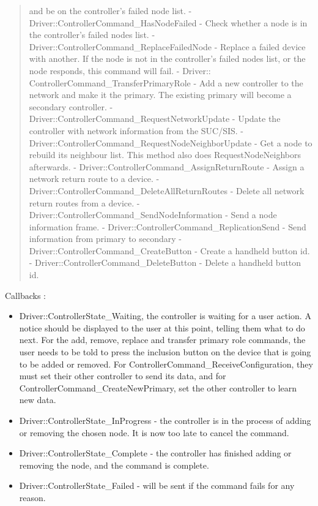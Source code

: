 \documentclass[letterpaper,10pt,english]{sphinxmanual}
\begin{document}
\begin{fulllineitems}
\begin{fulllineitems}
\begin{quote}
and be on the controller's failed node list.
- Driver::ControllerCommand\_HasNodeFailed - Check whether a node is in the controller's failed nodes list.
- Driver::ControllerCommand\_ReplaceFailedNode - Replace a failed device with another. If the node is not in
the controller's failed nodes list, or the node responds, this command will fail.
- Driver:: ControllerCommand\_TransferPrimaryRole - Add a new controller to the network and
make it the primary.  The existing primary will become a secondary controller.
- Driver::ControllerCommand\_RequestNetworkUpdate - Update the controller with network information from the SUC/SIS.
- Driver::ControllerCommand\_RequestNodeNeighborUpdate - Get a node to rebuild its neighbour list.  This method also does RequestNodeNeighbors afterwards.
- Driver::ControllerCommand\_AssignReturnRoute - Assign a network return route to a device.
- Driver::ControllerCommand\_DeleteAllReturnRoutes - Delete all network return routes from a device.
- Driver::ControllerCommand\_SendNodeInformation - Send a node information frame.
- Driver::ControllerCommand\_ReplicationSend - Send information from primary to secondary
- Driver::ControllerCommand\_CreateButton - Create a handheld button id.
- Driver::ControllerCommand\_DeleteButton - Delete a handheld button id.
\end{quote}

Callbacks :
\begin{itemize}
\item {} 
Driver::ControllerState\_Waiting, the controller is waiting for a user action.  A notice should be displayed to the user at this point, telling them what to do next. For the add, remove, replace and transfer primary role commands, the user needs to be told to press the inclusion button on the device that  is going to be added or removed.  For ControllerCommand\_ReceiveConfiguration, they must set their other controller to send its data, and for ControllerCommand\_CreateNewPrimary, set the other controller to learn new data.

\item {} 
Driver::ControllerState\_InProgress - the controller is in the process of adding or removing the chosen node.  It is now too late to cancel the command.

\item {} 
Driver::ControllerState\_Complete - the controller has finished adding or removing the node, and the command is complete.

\item {} 
Driver::ControllerState\_Failed - will be sent if the command fails for any reason.


\end{itemize}
\end{fulllineitems}
\end{fulllineitems}
\end{document}
